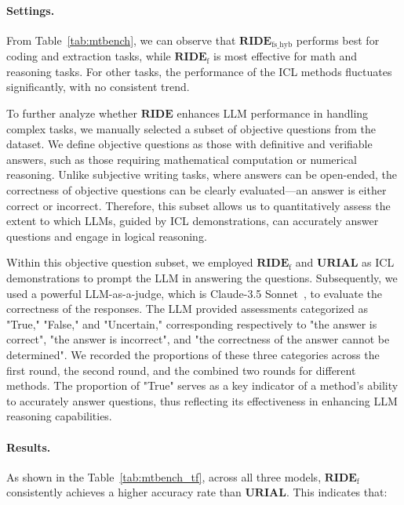 \paragraph{Settings.} From Table~\ref{tab:mtbench}, we can observe that $\textbf{RIDE}_{\text{fs\_hyb}}$ performs best for coding and extraction tasks, while $\textbf{RIDE}_{\text{f}}$ is most effective for math and reasoning tasks. 
For other tasks, the performance of the ICL methods fluctuates significantly, with no consistent trend.

To further analyze whether $\textbf{RIDE}$ enhances LLM performance in handling complex tasks, we manually selected a subset of objective questions from the \mtbench{} dataset. 
We define objective questions as those with definitive and verifiable answers, such as those requiring mathematical computation or numerical reasoning. 
Unlike subjective writing tasks, where answers can be open-ended, the correctness of objective questions can be clearly evaluated—an answer is either correct or incorrect. 
Therefore, this subset allows us to quantitatively assess the extent to which LLMs, guided by ICL demonstrations, can accurately answer questions and engage in logical reasoning.

Within this objective question subset, we employed $\textbf{RIDE}_{\text{f}}$ and $\textbf{URIAL}$ as ICL demonstrations to prompt the LLM in answering the questions. 
Subsequently, we used a powerful LLM-as-a-judge, which is Claude-3.5 Sonnet~\cite{anthropic2024claude3.5s}, to evaluate the correctness of the responses. 
The LLM provided assessments categorized as "True," "False," and "Uncertain," corresponding respectively to "the answer is correct", "the answer is incorrect", and "the correctness of the answer cannot be determined". 
We recorded the proportions of these three categories across the first round, the second round, and the combined two rounds for different methods. The proportion of "True" serves as a key indicator of a method’s ability to accurately answer questions, thus reflecting its effectiveness in enhancing LLM reasoning capabilities.

\paragraph{Results.} As shown in the Table~\ref{tab:mtbench_tf}, across all three models, $\textbf{RIDE}_{\text{f}}$ consistently achieves a higher accuracy rate than $\textbf{URIAL}$. This indicates that:

